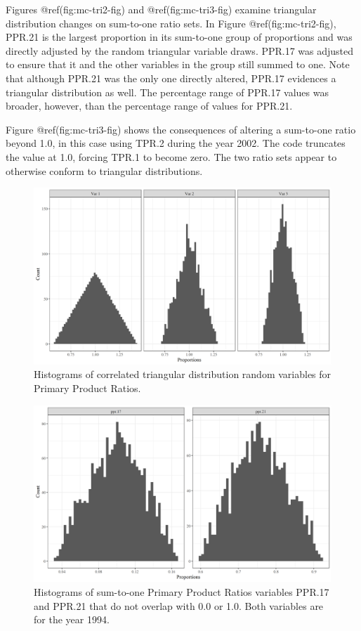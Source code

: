 \documentclass[
  openany]{book}
\begin{document}
Figures @ref(fig:mc-tri2-fig) and @ref(fig:mc-tri3-fig) examine
triangular distribution changes on sum-to-one ratio sets. In Figure
@ref(fig:mc-tri2-fig), PPR.21 is the largest proportion in its
sum-to-one group of proportions and was directly adjusted by the random
triangular variable draws. PPR.17 was adjusted to ensure that it and the
other variables in the group still summed to one. Note that although
PPR.21 was the only one directly altered, PPR.17 evidences a triangular
distribution as well. The percentage range of PPR.17 values was broader,
however, than the percentage range of values for PPR.21.

Figure @ref(fig:mc-tri3-fig) shows the consequences of altering a
sum-to-one ratio beyond 1.0, in this case using TPR.2 during the year
2002. The code truncates the value at 1.0, forcing TPR.1 to become zero.
The two ratio sets appear to otherwise conform to triangular
distributions.

\begin{figure}
\includegraphics[width=1\linewidth]{images/triang1} \caption{Histograms of correlated triangular distribution random variables for Primary Product Ratios.}\label{fig:mc-tri1-fig}
\end{figure}

\begin{figure}
\includegraphics[width=1\linewidth]{images/triang2} \caption{Histograms of sum-to-one Primary Product Ratios variables PPR.17 and PPR.21 that do not overlap with 0.0 or 1.0.  Both variables are for the year 1994.}\label{fig:mc-tri2-fig}
\end{figure}
\end{document}
